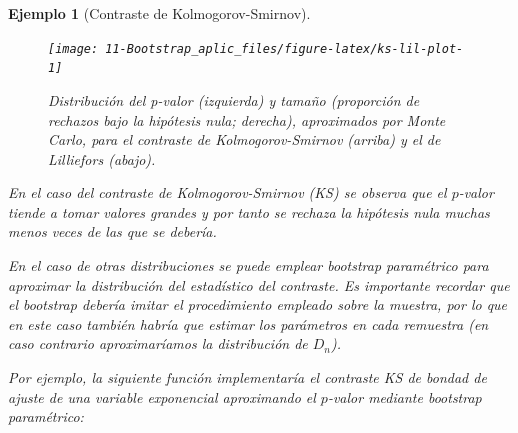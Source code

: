 \documentclass[
]{book}
\theoremstyle{break}
\newtheorem{example}{Ejemplo}[chapter]
\theoremstyle{nonumberplain}
\begin{document}
\begin{example}[Contraste de Kolmogorov-Smirnov]
\begin{figure}[!htb]

{\centering \texttt{[image: 11-Bootstrap\_aplic\_files/figure-latex/ks-lil-plot-1]} 

}

\caption{Distribución del p-valor (izquierda) y tamaño (proporción de rechazos bajo la hipótesis nula; derecha), aproximados por Monte Carlo, para el contraste de Kolmogorov-Smirnov (arriba) y el de Lilliefors (abajo).}\label{fig:ks-lil-plot}
\end{figure}

En el caso del contraste de Kolmogorov-Smirnov (KS) se observa que el \(p\)-valor
tiende a tomar valores grandes y por tanto se rechaza la hipótesis nula
muchas menos veces de las que se debería.

En el caso de otras distribuciones se puede emplear bootstrap paramétrico para
aproximar la distribución del estadístico del contraste.
Es importante recordar que el bootstrap debería imitar el procedimiento
empleado sobre la muestra, por lo que en este caso también habría que estimar
los parámetros en cada remuestra
(en caso contrario aproximaríamos la distribución de \(D_n\)).

Por ejemplo, la siguiente función implementaría el contraste KS de
bondad de ajuste de una variable exponencial aproximando el
\(p\)-valor mediante bootstrap paramétrico:


\end{example}
\end{document}
